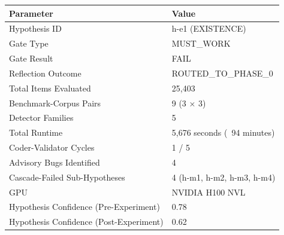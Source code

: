 
\begin{table}[htbp]
\centering
\begin{tabular}{ll}
\toprule
Parameter & Value \\
\midrule
Hypothesis ID & h-e1 (EXISTENCE) \\
Gate Type & MUST_WORK \\
Gate Result & FAIL \\
Reflection Outcome & ROUTED_TO_PHASE_0 \\
Total Items Evaluated & 25,403 \\
Benchmark-Corpus Pairs & 9 (3 × 3) \\
Detector Families & 5 \\
Total Runtime & 5,676 seconds (~94 minutes) \\
Coder-Validator Cycles & 1 / 5 \\
Advisory Bugs Identified & 4 \\
Cascade-Failed Sub-Hypotheses & 4 (h-m1, h-m2, h-m3, h-m4) \\
GPU & NVIDIA H100 NVL \\
Hypothesis Confidence (Pre-Experiment) & 0.78 \\
Hypothesis Confidence (Post-Experiment) & 0.62 \\
\bottomrule
\end{tabular}
\end{table}

